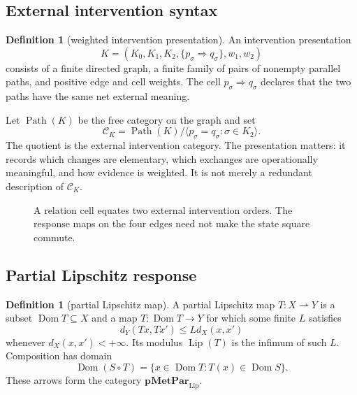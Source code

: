 \documentclass[11pt]{article}
\theoremstyle{definition}
\newtheorem{definition}[theorem]{Definition}
\theoremstyle{remark}
\newcommand{\Path}{\operatorname{Path}}
\newcommand{\Dom}{\operatorname{Dom}}
\newcommand{\Lip}{\operatorname{Lip}}
\newcommand{\cK}{\mathcal{C}_K}
\begin{document}
\subsection{External intervention syntax}

\begin{definition}[weighted intervention presentation]
An intervention presentation
\[
K=(K_0,K_1,K_2,\{p_\sigma\Rightarrow q_\sigma\},w_1,w_2)
\]
consists of a finite directed graph, a finite family of pairs of nonempty
parallel paths, and positive edge and cell weights. The cell
\(p_\sigma\Rightarrow q_\sigma\) declares that the two paths have the same
net external meaning.
\end{definition}

Let \(\Path(K)\) be the free category on the graph and set
\[
\cK=\Path(K)/\langle p_\sigma=q_\sigma:\sigma\in K_2\rangle.
\]
The quotient is the external intervention category. The presentation matters:
it records which changes are elementary, which exchanges are operationally
meaningful, and how evidence is weighted. It is not merely a redundant
description of \(\cK\).

\begin{figure}[t]
\centering
{}
\caption{A relation cell equates two external intervention orders. The
response maps on the four edges need not make the state square commute.}
\label{fig:square}
\end{figure}

\subsection{Partial Lipschitz response}

\begin{definition}[partial Lipschitz map]
A partial Lipschitz map \(T:X\rightharpoonup Y\) is a subset
\(\Dom T\subseteq X\) and a map \(T:\Dom T\to Y\) for which some finite
\(L\) satisfies
\[
d_Y(Tx,Tx')\le Ld_X(x,x')
\]
whenever \(d_X(x,x')<+\infty\). Its modulus \(\Lip(T)\) is the infimum
of such \(L\). Composition has domain
\[
\Dom(S\circ T)=\{x\in\Dom T:T(x)\in\Dom S\}.
\]
These arrows form the category \(\mathbf{pMetPar}_{\mathrm{Lip}}\).
\end{definition}
\end{document}
